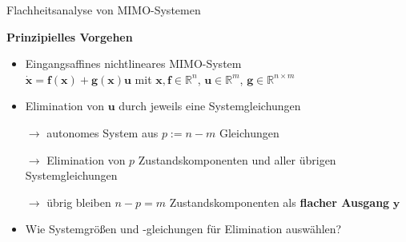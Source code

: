 \documentclass[
	ngerman,
	10pt,				%
	aspectratio=169 	%
]{beamer}
\begin{document}

\begin{frame}[t,fragile,label=Flachheit_2]{\large Flachheitsanalyse von MIMO-Systemen}
	
	\textbf{Prinzipielles Vorgehen}
	
	\begin{itemize}
		\pause
		\item  Eingangsaffines nichtlineares MIMO-System\\
		$\dot{\mathbf{x}} = \mathbf{f}(\mathbf{x}) + \mathbf{g}(\mathbf{x}) \mathbf{u}$ \quad mit \quad $\mathbf{x}, \mathbf{f} \in \mathbb{R}^n$, $\mathbf{u} \in \mathbb{R}^m$, $\mathbf{g} \in \mathbb{R}^{n \times m}$
		
		\pause
		\item Elimination von $\mathbf{u}$ durch jeweils eine Systemgleichungen
		\pause
		\item[$\rightarrow$] autonomes System aus $p := n - m$ Gleichungen
		\pause
		\item[$\rightarrow$] Elimination von $p$ Zustandskomponenten und aller übrigen Systemgleichungen
		\pause
		\item[$\rightarrow$] übrig bleiben $n - p = m $ Zustandskomponenten als \textbf{flacher Ausgang} $\mathbf{y}$
		\item Wie Systemgrößen und -gleichungen für Elimination auswählen?
	\end{itemize}
	
\end{frame}

\end{document}
